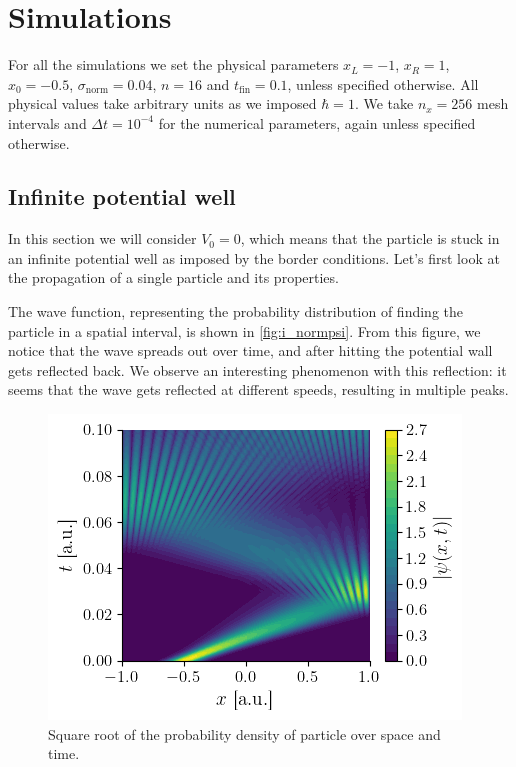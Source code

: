\section{Simulations}

For all the simulations we set the physical parameters \(x_L = -1\), \(x_R = 1\), \(x_0 = -0.5\), \(\sigma_\textrm{norm} = 0.04\), \(n = 16\) and \(t_\textrm{fin} = 0.1\), unless specified otherwise. All physical values take arbitrary units as we imposed \(\hbar = 1\). We take \(n_x = 256\) mesh intervals and \(\Delta t = 10^{-4}\) for the numerical parameters, again unless specified otherwise.

\subsection{Infinite potential well}

In this section we will consider \(V_0 = 0\), which means that the particle is stuck in an infinite potential well as imposed by the border conditions. Let's first look at the propagation of a single particle and its properties.

The wave function, representing the probability distribution of finding the particle in a spatial interval, is shown in \autoref{fig:i_normpsi}. From this figure, we notice that the wave spreads out over time, and after hitting the potential wall gets reflected back. We observe an interesting phenomenon with this reflection: it seems that the wave gets reflected at different speeds, resulting in multiple peaks.

\begin{figure}[h]
    \centering
    \includegraphics[width=0.6\linewidth]{figures/i_normpsi.png}
    \caption{Square root of the probability density of particle over space and time.}
    \label{fig:i_normpsi}
\end{figure}

